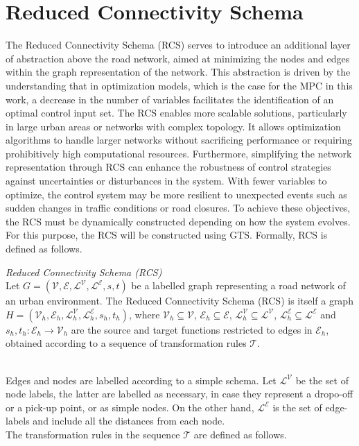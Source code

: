 \newpage


\section{Reduced Connectivity Schema }\label{sec:gts_mpc}
The Reduced Connectivity Schema (RCS) serves to introduce an additional layer of abstraction above the road network, aimed at minimizing the nodes and edges within the graph representation of the network. This abstraction is driven by the understanding that in optimization models, which is the case for the MPC in this work, a decrease in the number of variables facilitates the identification of an optimal control input set. The RCS enables more scalable solutions, particularly in large urban areas or networks with complex topology. It allows optimization algorithms to handle larger networks without sacrificing performance or requiring prohibitively high computational resources. Furthermore, simplifying the network representation through RCS can enhance the robustness of control strategies against uncertainties or disturbances in the system. With fewer variables to optimize, the control system may be more resilient to unexpected events such as sudden changes in traffic conditions or road closures. To achieve these objectives, the RCS must be dynamically constructed depending on how the system evolves. For this purpose, the RCS will be constructed using GTS. Formally, RCS is defined as follows. \\

\begin{definition}{\textit{Reduced Connectivity Schema (RCS)}\\}
	Let $G = (\mathcal{V},\mathcal{E},\mathcal{L}^\mathcal{V},\mathcal{L}^\mathcal{E},s,t)$ be a labelled graph representing a road network of an urban environment. The Reduced Connectivity Schema (RCS) is itself a graph $H = (\mathcal{V}_h,\mathcal{E}_h,\mathcal{L}^\mathcal{V}_h,\mathcal{L}^\mathcal{E}_h,s_h,t_h)$, where $\mathcal{V}_h \subseteq \mathcal{V}$, $\mathcal{E}_h \subseteq \mathcal{E}$, $\mathcal{L}^\mathcal{V}_h \subseteq \mathcal{L}^\mathcal{V}$, $\mathcal{L}^\mathcal{E}_h \subseteq \mathcal{L}^\mathcal{E}$ and $s_h, t_h : \mathcal{E}_h \rightarrow \mathcal{V}_h$ are the source and target functions restricted to edges in $\mathcal{E}_h$, obtained according to a sequence of transformation rules $\mathcal{T}$.
\end{definition}\\

Edges and nodes are labelled according to a simple schema. Let $\mathcal{L}^\mathcal{V}$ be the set of node labels, the latter are labelled as necessary, in case they represent a dropo-off or a pick-up point, or as simple nodes. On the other hand, $\mathcal{L}^\mathcal{E}$ is the set of edge-labels and include all the distances from each node. \\
The transformation rules in the sequence $\mathcal{T}$ are defined as follows.\\

